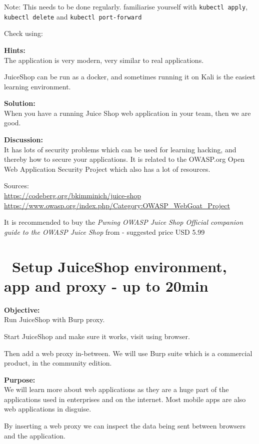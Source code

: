 \documentclass[a4paper,11pt,notitlepage]{report}
\begin{document}
Note: This needs to be done regularly. familiarise yourself with \verb+kubectl apply+, \verb+kubectl delete+ and \verb+kubectl port-forward+


Check using: 

{\bf Hints:}\\
The application is very modern, very similar to real applications.


JuiceShop can be run as a docker, and sometimes running it on Kali is the easiest learning environment.

{\bf Solution:}\\
When you have a running Juice Shop web application in your team, then we are good.

{\bf Discussion:}\\
It has lots of security problems which can be used for learning
hacking, and thereby how to secure your applications. It is  related
to the OWASP.org Open Web Application Security Project which also has a
lot of resources.

Sources:\\
\url{https://codeberg.org/bkimminich/juice-shop}\\
\url{https://www.owasp.org/index.php/Category:OWASP_WebGoat_Project}

It is recommended to buy the \emph{Pwning OWASP Juice Shop Official companion guide to the OWASP Juice Shop} from  - suggested price USD 5.99



\chapter{\faInfoCircle\ Setup JuiceShop environment, app and proxy - up to 20min}
\label{ex:js-burp}

{\bf Objective:}\\
Run JuiceShop with Burp proxy.

Start JuiceShop and make sure it works, visit using browser.

Then add a web proxy in-between. We will use Burp suite which is a commercial product, in the community edition.

{\bf Purpose:}\\
We will learn more about web applications as they are a huge part of the applications used in enterprises and on the internet. Most mobile apps are also web applications in disguise.

By inserting a web proxy we can inspect the data being sent between browsers and the application.
\end{document}
